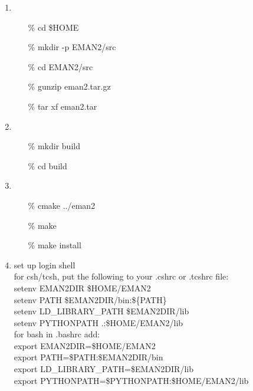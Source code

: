 \begin{enumerate}
    \item
      \begin{itemize}
          \item[\%] cd \$HOME
          \item[\%] mkdir -p EMAN2/src
          \item[\%] cd EMAN2/src
          \item[\%] gunzip eman2.tar.gz
          \item[\%] tar xf eman2.tar \\
      \end{itemize}

    \item
      \begin{itemize}
	  \item[\%]mkdir build
	  \item[\%]cd build \\
       \end{itemize}

     \item       
       \begin{itemize}
	 \item[\%]cmake ../eman2
         \item[\%]make
         \item[\%]make install \\
       \end{itemize}

     \item
          set up login shell\\
          for csh/tcsh, put the following to your .cshrc or .tcshrc file:\\
          
          setenv EMAN2DIR \$HOME/EMAN2\\
          setenv PATH \$EMAN2DIR/bin:\$\{PATH\}\\
          setenv LD\_LIBRARY\_PATH  \$EMAN2DIR/lib\\
          setenv PYTHONPATH .:\$HOME/EMAN2/lib\\

	  for bash in .bashrc add:\\
	
          export EMAN2DIR=\$HOME/EMAN2\\
          export PATH=\$PATH:\$EMAN2DIR/bin\\
          export LD\_LIBRARY\_PATH=\$EMAN2DIR/lib\\
          export PYTHONPATH=\$PYTHONPATH:\$HOME/EMAN2/lib
\end{enumerate}


